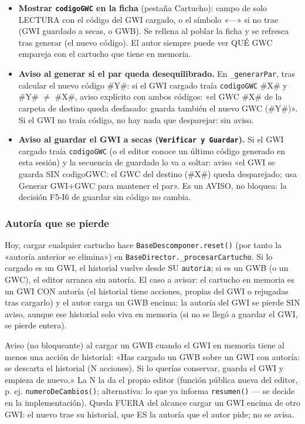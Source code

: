 \begin{itemize}
	\item \textbf{Mostrar \texttt{codigoGWC} en la ficha} (pestaña Cartucho): campo de solo LECTURA con el código del GWI cargado, o el símbolo «---» si no trae (GWI guardado a secas, o GWB). Se rellena al poblar la ficha y se refresca tras generar (el nuevo código). El autor siempre puede ver QUÉ GWC empareja con el cartucho que tiene en memoria.
	\item \textbf{Aviso al generar si el par queda desequilibrado.} En \texttt{\_generarPar}, tras calcular el nuevo código \#Y\#: si el GWI cargado traía \texttt{codigoGWC} \#X\# y \#Y\# $\neq$ \#X\#, aviso explícito con ambos códigos: «el GWC \#X\# de la carpeta de destino queda desfasado: guarda también el nuevo GWC (\#Y\#)». Si el GWI no traía código, no hay nada que desparejar: sin aviso.
	\item \textbf{Aviso al guardar el GWI a secas (\texttt{Verificar y Guardar}).} Si el GWI cargado traía \texttt{codigoGWC} (o el editor conoce un último código generado en esta sesión) y la secuencia de guardado lo va a soltar: aviso «el GWI se guarda SIN codigoGWC: el GWC del destino (\#X\#) queda desparejado; usa Generar GWI+GWC para mantener el par». Es un AVISO, no bloquea: la decisión F5-I6 de guardar sin código no cambia.
\end{itemize}

\subsubsection{Autoría que se pierde}
\label{sec:F5I17Autoria}

Hoy, cargar cualquier cartucho hace \texttt{BaseDescomponer.reset()} (por tanto la «autoría anterior se elimina») en \texttt{BaseDirector.\_procesarCartucho}. Si lo cargado es un GWI, el historial vuelve desde SU \texttt{autoria}; si es un GWB (o un GWC), el editor arranca sin autoría. El caso a avisar: el cartucho en memoria es un GWI CON autoría (el historial tiene acciones, propias del GWI o rejugadas tras cargarlo) y el autor carga un GWB encima: la autoría del GWI se pierde SIN aviso, aunque ese historial solo viva en memoria (si no se llegó a guardar el GWI, se pierde entera).

Aviso (no bloqueante) al cargar un GWB cuando el GWI en memoria tiene al menos una acción de historial: «Has cargado un GWB sobre un GWI con autoría: se descarta el historial (N acciones). Si lo querías conservar, guarda el GWI y empieza de nuevo.» La N la da el propio editor (función pública nueva del editor, p. ej. \texttt{numeroDeCambios()}; alternativa: lo que ya informa \texttt{resumen()} — se decide en la implementación). Queda FUERA del alcance cargar un GWI encima de otro GWI: el nuevo trae su historial, que ES la autoría que el autor pide; no se avisa.

